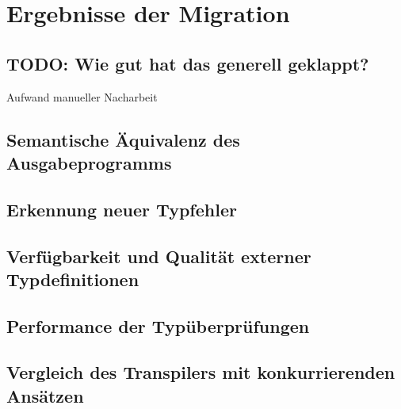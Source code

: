 \chapter{Ergebnisse der Migration}

\section{TODO: Wie gut hat das generell geklappt?}

Aufwand manueller Nacharbeit

\section{Semantische Äquivalenz des Ausgabeprogramms}

\section{Erkennung neuer Typfehler}

\section{Verfügbarkeit und Qualität externer Typdefinitionen}

\section{Performance der Typüberprüfungen}

\section{Vergleich des Transpilers mit konkurrierenden Ansätzen}
